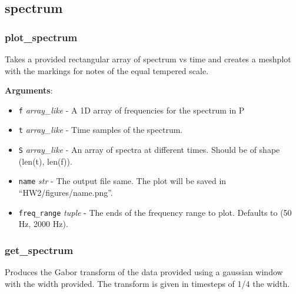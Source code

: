 \subsection{spectrum}

\subsubsection{plot\_spectrum}

\begin{Shaded}
\begin{Highlighting}[]
\OperatorTok{=}\NormalTok{(}\NormalTok{, }\NormalTok{))}
\end{Highlighting}
\end{Shaded}

Takes a provided rectangular array of spectrum vs time and creates a
meshplot with the markings for notes of the equal tempered scale.

\textbf{Arguments}:

\begin{itemize}
\tightlist
\item
  \texttt{f} \emph{array\_like} - A 1D array of frequencies for the
  spectrum in P
\item
  \texttt{t} \emph{array\_like} - Time samples of the spectrum.
\item
  \texttt{S} \emph{array\_like} - An array of spectra at different
  times. Should be of shape (len(t), len(f)).
\item
  \texttt{name} \emph{str} - The output file same. The plot will be
  saved in ``HW2/figures/name.png''.
\item
  \texttt{freq\_range} \emph{tuple} - The ends of the frequency range to
  plot. Defaults to (50 Hz, 2000 Hz).
\end{itemize}

\subsubsection{get\_spectrum}

\begin{Shaded}
\begin{Highlighting}[]
\end{Highlighting}
\end{Shaded}

Produces the Gabor transform of the data provided using a gaussian
window with the width provided. The transform is given in timesteps of
1/4 the width.

